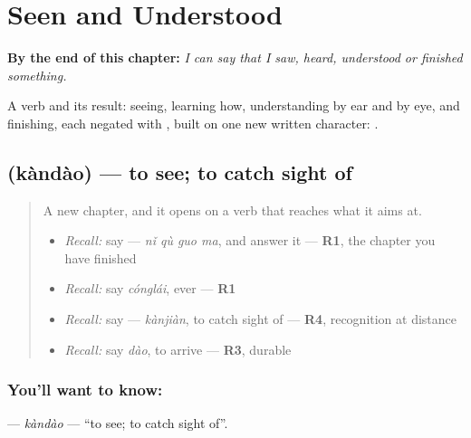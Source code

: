 
\chapter{Seen and Understood}
\label{ch:zh-seen-and-understood}

\begin{chapteropening}
\textbf{By the end of this chapter:} \emph{I can say that I saw, heard, understood or finished something.}

A verb and its result: seeing, learning how, understanding by ear and by eye, and finishing, each negated with , built on one new written character: .
\end{chapteropening}

\section[\texorpdfstring{\zh{看到} (kàndào)}{看到 (kàndào)}]{ (kàndào) — to see; to catch sight of}

\label{lesson:ZH-C151-kandao}



\begin{quote}
A new chapter, and it opens on a verb that reaches what it aims at.

\begin{itemize}
\raggedright
  \item \emph{Recall:} say  — \emph{nǐ qù guo ma}, and answer it — \textbf{R1}, the chapter you have finished
  \item \emph{Recall:} say \emph{cónglái}, ever — \textbf{R1}
  \item \emph{Recall:} say  — \emph{kànjiàn}, to catch sight of — \textbf{R4}, recognition at distance
  \item \emph{Recall:} say \emph{dào}, to arrive — \textbf{R3}, durable
\end{itemize}
\end{quote}

\subsection*{You'll want to know: }
\textbf{} — \emph{kàndào} — \textquotedblleft{}to see; to catch sight of\textquotedblright{}.

